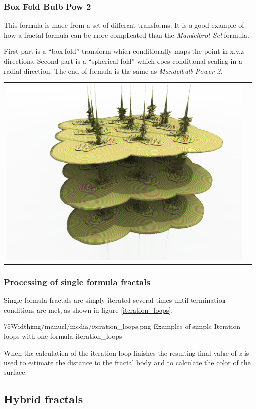 \subsubsection{Box Fold Bulb Pow 2}

This formula is made from a set of different transforms. It is a good example of
how a fractal formula can be more complicated than the
\emph{Mandelbrot Set} formula.

First part is a ``box fold'' transform which conditionally maps the point in x,y,z  directions. Second part is a ``spherical fold'' which does conditional scaling in a radial direction.
The end of formula is the same as \emph{Mandelbulb Power 2}.

\begin{tabular}{l l}
	\includegraphics[width=0.3\linewidth]{img/manual/media/formula_box_fold_pwr2.png}	
	& 
	\begin{minipage}[b]{0.5\linewidth}
		
	\end{minipage}
\end{tabular} 

\subsubsection{Processing of single formula fractals}

Single formula fractals are simply iterated several times until termination conditions are met, as shown in figure \ref{iteration_loops}. \nolinebreak \nopagebreak


\simpleImageWithCaption75Width{img/manual/media/iteration_loops.png}
{Examples of simple Iteration loops with one formula}
{iteration_loops}

When the calculation of the iteration loop finishes the resulting final value of \emph{z} is
used to estimate the distance to the fractal body and to calculate the color of the surface.

\subsection{Hybrid fractals}

